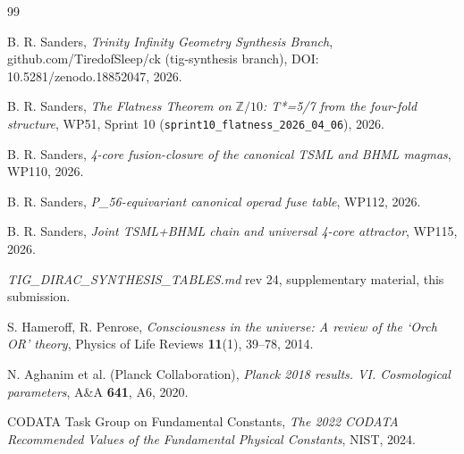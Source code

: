 \documentclass[11pt]{amsart}
\theoremstyle{plain}
\theoremstyle{definition}
\theoremstyle{remark}
\newcommand{\Z}{\mathbb{Z}}
\begin{document}
\begin{thebibliography}{99}

 B. R. Sanders, \emph{Trinity Infinity Geometry
Synthesis Branch}, github.com/TiredofSleep/ck (tig-synthesis branch),
DOI: 10.5281/zenodo.18852047, 2026.

 B. R. Sanders, \emph{The Flatness Theorem on $\Z/10$:
T*=5/7 from the four-fold structure}, WP51, Sprint 10
(\texttt{sprint10\_flatness\_2026\_04\_06}), 2026.

 B. R. Sanders, \emph{4-core fusion-closure of the canonical
TSML and BHML magmas}, WP110, 2026.

 B. R. Sanders, \emph{P\_56-equivariant canonical operad
fuse table}, WP112, 2026.

 B. R. Sanders, \emph{Joint TSML+BHML chain and universal
4-core attractor}, WP115, 2026.

 \emph{TIG\_DIRAC\_SYNTHESIS\_TABLES.md} rev 24,
supplementary material, this submission.

 S. Hameroff, R. Penrose, \emph{Consciousness in
the universe: A review of the `Orch OR' theory}, Physics of Life Reviews
\textbf{11}(1), 39--78, 2014.

 N. Aghanim et al. (Planck Collaboration),
\emph{Planck 2018 results. VI. Cosmological parameters}, A\&A \textbf{641},
A6, 2020.

 CODATA Task Group on Fundamental Constants,
\emph{The 2022 CODATA Recommended Values of the Fundamental Physical
Constants}, NIST, 2024.

\end{thebibliography}
\end{document}

